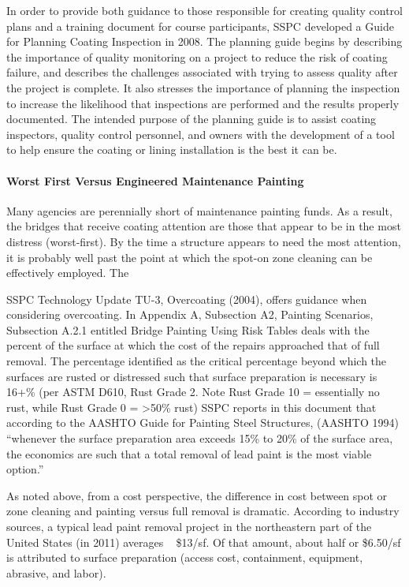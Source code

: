 In order to provide both guidance to those responsible for creating quality control plans and a training document
for course participants, SSPC developed a Guide for Planning Coating Inspection in 2008. The planning guide
begins by describing the importance of quality monitoring on a project to reduce the risk of coating failure, and
describes the challenges associated with trying to assess quality after the project is complete. It also stresses the
importance of planning the inspection to increase the likelihood that inspections are performed and the results
properly documented. The intended purpose of the planning guide is to assist coating inspectors, quality control
personnel, and owners with the development of a tool to help ensure the coating or lining installation is the best it can
be.

\paragraph{Worst First Versus Engineered Maintenance Painting}

Many agencies are perennially short of maintenance painting funds. As a result, the bridges that receive coating
attention are those that appear to be in the most distress (worst-first). By the time a structure appears to need the
most attention, it is probably well past the point at which the spot-on zone cleaning can be effectively employed. The

SSPC Technology Update TU-3, Overcoating (2004), offers guidance when considering overcoating. In Appendix
A, Subsection A2, Painting Scenarios, Subsection A.2.1 entitled Bridge Painting Using Risk Tables deals with the
percent of the surface at which the cost of the repairs approached that of full removal. The percentage identified as
the critical percentage beyond which the surfaces are rusted or distressed such that surface preparation is necessary is
16+\% (per ASTM D610, Rust Grade 2. Note Rust Grade 10 = essentially no rust, while Rust Grade 0 = >50\% rust)
SSPC reports in this document that according to the AASHTO Guide for Painting Steel Structures, (AASHTO
1994) “whenever the surface preparation area exceeds 15\% to 20\% of the surface area, the economics are such that a
total removal of lead paint is the most viable option.”

As noted above, from a cost perspective, the difference in cost between spot or zone cleaning and painting versus
full removal is dramatic. According to industry sources, a typical lead paint removal project in the northeastern part
of the United States (in 2011) averages ~ \$13/sf. Of that amount, about half or \$6.50/sf is attributed to surface
preparation (access cost, containment, equipment, abrasive, and labor).

